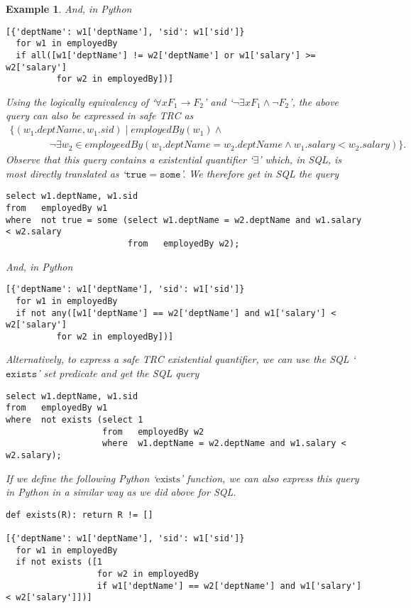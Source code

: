 \documentclass{article}
\newtheorem{example}{Example}
\begin{document}
\begin{example}
{And, in Python
\begin{verbatim}
[{'deptName': w1['deptName'], 'sid': w1['sid']}
  for w1 in employedBy 
  if all([w1['deptName'] != w2['deptName'] or w1['salary'] >= w2['salary']
          for w2 in employedBy])]
\end{verbatim}          

}


Using the logically equivalency of `$\forall x F_1\rightarrow F_2$' and `$\lnot\exists x F_1\land \lnot F_2$', the above query can also
be expressed in safe TRC as 
{\small
\[
\begin{array}{ll}
\{(w_1.deptName, w_1.sid)\mid employedBy(w_1) \land \\
\qquad\qquad \lnot \exists w_2\in employeedBy(w_1.deptName = w_2.deptName  \land w_1.salary < w_2.salary)\}.
\end{array}
\]
}
%
Observe that this query contains a existential quantifier `$\exists$' which, in SQL, is most directly translated 
as `$\mathtt{true = some}$'.  We therefore get in SQL the query
{\small
\begin{verbatim}
select w1.deptName, w1.sid
from   employedBy w1
where  not true = some (select w1.deptName = w2.deptName and w1.salary < w2.salary
                        from   employedBy w2);
\end{verbatim}
}

And, in Python
\begin{verbatim}
[{'deptName': w1['deptName'], 'sid': w1['sid']}
  for w1 in employedBy 
  if not any([w1['deptName'] == w2['deptName'] and w1['salary'] < w2['salary']
          for w2 in employedBy])]
\end{verbatim}    

%

\noindent
Alternatively, to express a safe TRC existential quantifier, we can use the SQL `$\mathtt{exists}$' set predicate and get the SQL query
{\small
\begin{verbatim}
select w1.deptName, w1.sid
from   employedBy w1
where  not exists (select 1
                   from   employedBy w2
                   where  w1.deptName = w2.deptName and w1.salary < w2.salary);
\end{verbatim}
}

If we define the following Python `$\text{exists}$' function, we can also express this query
in Python in a similar way as we did above for SQL.

{\small
\begin{verbatim}
def exists(R): return R != []

[{'deptName': w1['deptName'], 'sid': w1['sid']}
  for w1 in employedBy 
  if not exists ([1
                  for w2 in employedBy
                  if w1['deptName'] == w2['deptName'] and w1['salary'] < w2['salary']])]
\end{verbatim}
}


\end{example}
\end{document}
